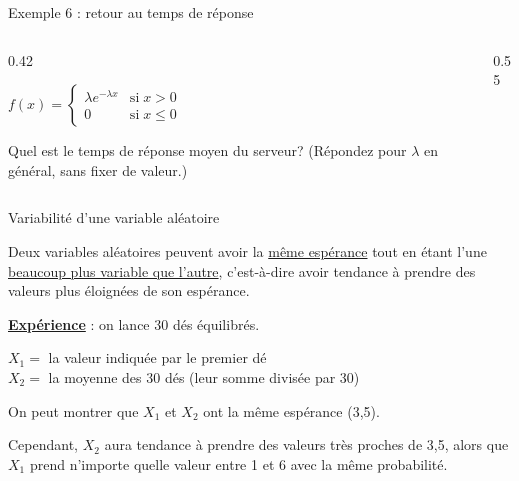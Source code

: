 \documentclass{BeamerTemplate}
\newcommand{\cibleReponse}{}
\newcommand{\lienreponse}[1]{\gdef\cibleReponse{#1}}
\begin{document}
\begin{frame}[t,label=ex6]{Exemple 6 : retour au temps de réponse}
\begin{columns}[T]
\begin{column}{0.42\textwidth}
{\small
$f(x)=\left\{\begin{array}{cl}\lambda e^{-\lambda x}&\text{si} \;x>0\\
 0&\text{si} \; x\leq 0
 \end{array}\right.$

\vspace{3mm}

Quel est le temps de réponse moyen du serveur? (Répondez pour $\lambda$ en général, sans fixer de valeur.)
}
\end{column}
\begin{column}{0.55\textwidth}
\end{column}
\end{columns}
\lienreponse{rep-ex2}
\end{frame}

\begin{frame}[t]{Variabilité d'une variable aléatoire}

Deux variables aléatoires peuvent avoir la \underline{même espérance}
 tout en étant l'une \underline{beaucoup plus variable
 que l'autre}, c'est-à-dire avoir tendance à prendre des valeurs
 plus éloignées de son espérance.

 \medskip
 {\bf \underline{Expérience}} : on lance 30 dés équilibrés.

 $X_1=$ la valeur indiquée par le premier dé\\
 $X_2=$ la moyenne des 30 dés (leur somme divisée par 30)

 \medskip
 On peut montrer que $X_1$ et $X_2$ ont la même
 espérance (3,5).

 \medskip
 Cependant, $X_2$ aura tendance à prendre
 des valeurs très proches de 3,5, alors que $X_1$ prend
 n'importe quelle valeur entre 1 et 6 avec la même probabilité.

\end{frame}
\end{document}
